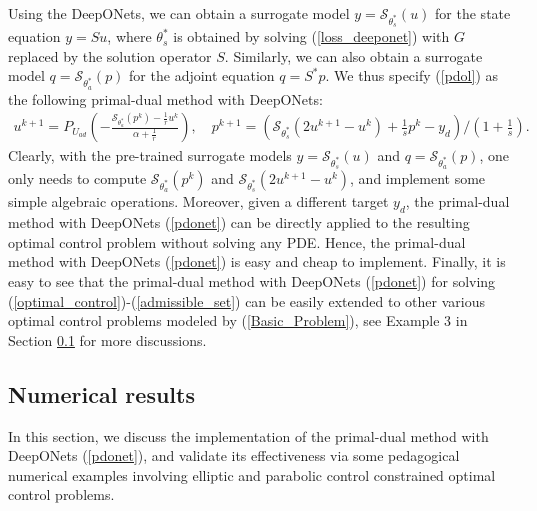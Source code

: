 \documentclass[final]{siamart171218}
\theoremstyle{remark}
\begin{document}
Using the DeepONets, we can obtain a surrogate model $y=\mathcal{S}_{\theta_s^*}(u)$ for the state equation $y=Su$, where $\theta_s^*$ is obtained by solving (\ref{loss_deeponet}) with $G$ replaced by the solution operator $S$. Similarly, we can also obtain a surrogate model $q=\mathcal{S}_{\theta_a^*}(p)$ for the adjoint equation $q=S^*p$. We thus specify (\ref{pdol}) as the following primal-dual method with DeepONets:
\begin{equation}\label{pdonet}
	\begin{aligned}
		u^{k+1}=P_{U_{ad}}\left(-\frac{\mathcal{S}_{\theta_a^*}({p}^k)-\frac{1}{r}u^k}{\alpha+\frac{1}{r}}\right),\quad
		p^{k+1}=(\mathcal{S}_{\theta_s^*}(2{u}^{k+1}-u^k)+\frac{1}{s}p^k-y_d)/(1+\frac{1}{s}).
	\end{aligned}
\end{equation}
Clearly, with the pre-trained surrogate models $y=\mathcal{S}_{\theta_s^*}(u)$ and $q=\mathcal{S}_{\theta_a^*}(p)$, one only needs to compute $\mathcal{S}_{\theta_a^*}({p}^k)$ and $\mathcal{S}_{\theta_s^*}(2{u}^{k+1}-u^k)$, and implement some simple algebraic operations.  Moreover,  given a different target $y_d$, the primal-dual method with DeepONets (\ref{pdonet}) can be directly applied to the resulting optimal control problem without solving any PDE.  Hence, the primal-dual method with DeepONets (\ref{pdonet}) is easy and cheap to implement. Finally, it is easy to see that the primal-dual method with DeepONets (\ref{pdonet}) for solving (\ref{optimal_control})-(\ref{admissible_set}) can be easily extended to other various optimal control problems modeled by (\ref{Basic_Problem}), see Example 3 in Section \ref{se: results_PDOL} for more discussions.


\subsection{Numerical results}\label{se: results_PDOL}
In this section, we discuss the implementation of the primal-dual method with DeepONets (\ref{pdonet}), and validate its effectiveness via some pedagogical numerical examples involving elliptic and parabolic control constrained optimal control problems.

\end{document}
